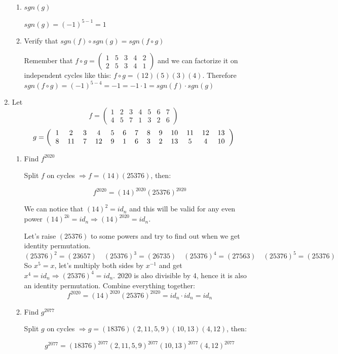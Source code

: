 \documentclass{article}
\begin{document}
\begin{enumerate}
\begin{enumerate}
\item $sgn(g)$

$sgn(g) = (-1)^{5-1} = 1$

\item Verify that $sgn(f) \circ sgn(g) = sgn(f \circ g)$

Remember that $f \circ g = \begin{pmatrix}
1&5&3&4&2\\
2&5&3&4&1
\end{pmatrix}$ and we can factorize it on independent cycles like this: $f \circ g=(12)(5)(3)(4)$. Therefore $sgn(f \circ g) = (-1)^{5-4} = -1 = -1 \cdot 1 = sgn(f) \cdot sgn(g)$

\end{enumerate}

\item Let \[f =\begin{pmatrix}1&2&3&4&5&6&7\\4&5&7&1&3&2&6\end{pmatrix}\]
\[g = 
\begin{pmatrix}
\begin{tabular}{ccccccccccccc}
1&2&3&4&5&6&7&8&9&10&11&12&13\\
8&11&7&12&9&1&6&3&2&13&5&4&10
\end{tabular}
\end{pmatrix}
\]

\begin{enumerate}
\item Find $f^{2020}$

Split $f$ on cycles $\Rightarrow f = (14)(25376)$, then:

\[f^{2020} = (14)^{2020}(25376)^{2020}\]

We can notice that $(14)^2=id_n$ and this will be valid for any even power $(14)^{2k} = id_n \Rightarrow (14)^{2020}=id_n$.

Let's raise $(25376)$ to some powers and try to find out when we get identity permutation.  
\[(25376)^2=(23657) \quad (25376)^3=(26735) \quad (25376)^4=(27563) \quad (25376)^5=(25376)\]
So $x^5=x$, let's multiply both sides by $x^{-1}$ and get $x^4 = id_n \Rightarrow (25376)^4 = id_n$. 2020 is also divisible by 4, hence it is also an identity permutation. Combine everything together:
\[f^{2020} = (14)^{2020}(25376)^{2020} = id_n \cdot id_n = id_n\]

\item Find $g^{2077}$

Split $g$ on cycles $\Rightarrow g = (18376)(2,11,5,9)(10,13)(4,12)$, then:

\[g^{2077} = (18376)^{2077}(2,11,5,9)^{2077}(10,13)^{2077}(4,12)^{2077}\]

\end{enumerate}

\end{enumerate}
\end{document}
